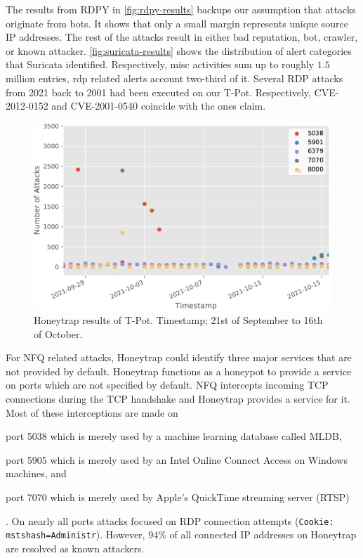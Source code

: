 The results from RDPY in \autoref{fig:rdpy-results} backups our assumption that attacks originate from bots.
It shows that only a small margin represents unique source IP addresses.
The rest of the attacks result in either bad reputation, bot, crawler, or known attacker.
\autoref{fig:suricata-results} shows the distribution of alert categories that Suricata identified.
Respectively, misc activities sum up to roughly $1.5$ million entries, \ac{rdp} related alerts account two-third of it.
Several RDP attacks from 2021 back to 2001 had been executed on our T-Pot.
Respectively, CVE-2012-0152 and CVE-2001-0540 coincide with the ones \citet{Kelly2021} claim.

\begin{figure}[ht]
    \centering
    \includegraphics[width=\textwidth]{figures/tpot-honeytrap-port.pdf}
    \caption[Honeytrap results of T-Pot]{
        Honeytrap results of T-Pot.
        Timestamp; 21st of September to 16th of October.
    }
    \label{fig:honeytrap-results}
\end{figure}
For NFQ related attacks, Honeytrap could identify three major services that are not provided by default.
Honeytrap functions as a honeypot to provide a service on ports which are not specified by default.
NFQ intercepts incoming TCP connections during the TCP handshake and Honeytrap provides a service for it.
Most of these interceptions are made on
\begin{enumerate*}[label=(\roman*)]
    \item port 5038 which is merely used by a machine learning database called MLDB,
    \item port 5905 which is merely used by an Intel Online Connect Access on Windows machines, and
    \item port 7070 which is merely used by Apple's QuickTime streaming server (RTSP)
\end{enumerate*}.
On nearly all ports attacks focused on RDP connection attempts (\verb|Cookie: mstshash=Administr|).
However, $94\%$ of all connected IP addresses on Honeytrap are resolved as known attackers.

